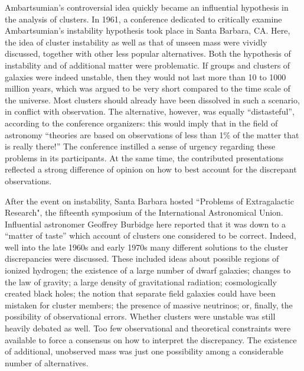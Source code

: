 \documentclass{naturefig}
\begin{document}
Ambartsumian's controversial idea quickly became an influential hypothesis in the analysis of clusters.\cite{Burbidge1959} In 1961, a conference dedicated to critically examine Ambartsumian's instability hypothesis took place in Santa Barbara, CA. Here, the idea of cluster instability as well as that of unseen mass were vividly discussed, together with other less popular alternatives. Both the hypothesis of instability and of additional matter were problematic. If groups and clusters of galaxies were indeed unstable, then they would not last more than 10 to 1000 million years, which was argued to be very short compared to the time scale of the universe.\cite{VandenBergh1961} Most clusters should already have been dissolved in such a scenario, in conflict with observation. The alternative, however, was equally ``distasteful'', %
according to the conference organizers: this would imply that in the field of astronomy ``theories are based on  observations of less than 1\% of the matter that is really there!''\cite{Neyman1961a} The conference instilled a sense of urgency regarding these problems in its participants. At the same time, the contributed presentations reflected a strong difference of opinion on how to best account for the discrepant observations.

After the event on instability, Santa Barbara hosted ``Problems of Extragalactic Research", the fifteenth symposium of the International Astronomical Union. Influential astronomer Geoffrey Burbidge here reported that it was down to a ``matter of taste'' which account of clusters one considered to be correct.\cite{Burbidge1962} %
Indeed, well into the late 1960s and early 1970s many different solutions to the cluster discrepancies were discussed. These included ideas about possible regions of ionized hydrogen;\cite{Woolf1967} the existence of a large number of dwarf galaxies;\cite{Reddish1968} changes to the law of gravity;\cite{Finzi1963,Forman1970,Jackson1970} a large density of gravitational radiation;\cite{Field1971} cosmologically created black holes;\cite{Hawking1971} the notion that separate field galaxies could have been mistaken for cluster members;\cite{Gott1973} the presence of massive neutrinos;\cite{Cowsik1972} or, finally, the possibility of observational errors.\cite{Abell1975} Whether clusters were unstable was still heavily debated as well.\cite{Karachentsev1966,Burbidge1969,DeVaucouleurs1975} Too few observational and theoretical constraints were available to force a consensus on how to interpret the discrepancy. The existence of additional, unobserved mass was just one possibility among a considerable number of alternatives.
\end{document}
